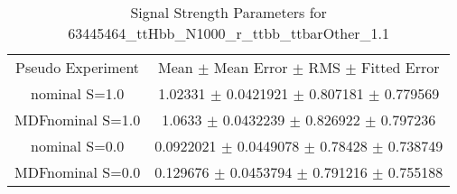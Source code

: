 \begin{table}
\centering
\caption{Signal Strength Parameters for 63445464\_ttHbb\_N1000\_r\_ttbb\_ttbarOther\_1.1}
\begin{tabular}{cc}
\toprule
Pseudo Experiment & Mean $\pm$ Mean Error $\pm$ RMS $\pm$ Fitted Error\\
nominal S=1.0 & \num{1.02331} $\pm$ \num{0.0421921} $\pm$ \num{0.807181} $\pm$ \num{0.779569}\\
MDFnominal S=1.0 & \num{1.0633} $\pm$ \num{0.0432239} $\pm$ \num{0.826922} $\pm$ \num{0.797236}\\
nominal S=0.0 & \num{0.0922021} $\pm$ \num{0.0449078} $\pm$ \num{0.78428} $\pm$ \num{0.738749}\\
MDFnominal S=0.0 & \num{0.129676} $\pm$ \num{0.0453794} $\pm$ \num{0.791216} $\pm$ \num{0.755188}\\
\bottomrule
\end{tabular}
\end{table}